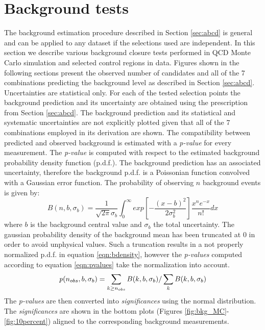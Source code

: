 \section{Background tests}
\label{sec:backgroundtests}
The background estimation procedure described in Section \ref{sec:abcd} is general and can be applied
to any dataset if the selections used are independent.
In this section we describe various background closure tests
 performed in QCD Monte Carlo simulation and 
selected control regions in data. Figures shown in the following sections present the observed number
of candidates and all of the 7 combinations predicting the background level as described
 in Section \ref{sec:abcd}.
Uncertainties are statistical only. For each of the tested selection points the background prediction 
and its uncertainty are obtained 
using the prescription from Section \ref{sec:abcd}. The background prediction and its statistical 
and systematic uncertainties are
 not explicitly plotted given that all of the 7 combinations employed in its derivation are shown.  
The compatibility between predicted and observed background is estimated with a {\it p-value} for every measurement. 
 The {\it p-value}
is computed with respect to the estimated background probability density function (p.d.f.). 
The background prediction has an associated uncertainty, 
therefore the background p.d.f. is a Poissonian function convolved  
with a Gaussian error function. The probability of observing $n$ background events is given by:
\begin{equation}
B(n,b,\sigma_b)= \frac{1}{\sqrt{2\pi}\sigma_b} \int_{0}^{\infty} 
exp\left[ -\frac{\left(x-b\right)^2}{2\sigma_b^2}\right]\frac{x^n e^{-x}}{n!}dx
\label{eqn:bdensity}
\end{equation}
where $b$ is the background central value and $\sigma_b$ the total uncertainty.
The gaussian probability density of the background mean has been truncated at 
0 in order to avoid unphysical values. Such a truncation results in a not properly normalized p.d.f. in equation 
\ref{eqn:bdensity}, however the {\it p-values} computed according to equation \ref{eqn:pvalues} take the 
normalization into account.   
\begin{equation}
{\it p} (n_{obs},b,\sigma_b) = \sum_{k\geq n_{obs}} B(k,b,\sigma_b) / \sum_{k} B(k,b,\sigma_b)
\label{eqn:pvalues}
\end{equation}
The {\it p-values} are then converted into {\it significances} using the normal
 distribution. The {\it significances} are shown in the bottom plots (Figures 
\ref{fig:bkg_MC}-\ref{fig:10percent}) aligned to the corresponding background
measurements.  

